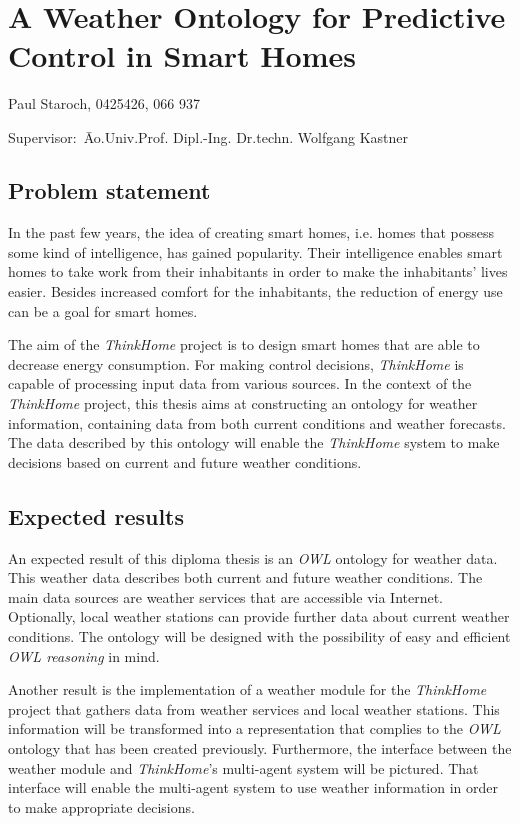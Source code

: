 \documentclass{scrartcl}
\begin{document}
~\vspace{0.5cm}
\section*{A Weather Ontology for Predictive Control in Smart Homes}
Paul Staroch, 0425426, 066 937
\begin{tabbing}
Supervisor:\ \= Ao.Univ.Prof. Dipl.-Ing. Dr.techn. Wolfgang Kastner\\
\end{tabbing}

\subsection*{Problem statement}
In the past few years, the idea of creating smart homes, i.e. homes that possess some kind of intelligence, has gained popularity.
Their intelligence enables smart homes to take work from their inhabitants in order to make the inhabitants' lives easier.
Besides increased comfort for the inhabitants, the reduction of energy use can be a goal for smart homes.

The aim of the \textit{ThinkHome} project \cite{CR2011-TH_Journal} \cite{CR2010-DEST_ThinkHome} is to design smart homes that are able to decrease energy consumption.
For making control decisions, \textit{ThinkHome} is capable of processing input data from various sources.
In the context of the \textit{ThinkHome} project, this thesis aims at constructing an ontology for weather information, containing data from both current conditions and weather forecasts.
The data described by this ontology will enable the \textit{ThinkHome} system to make decisions based on current and future weather conditions.

\subsection*{Expected results}
An expected result of this diploma thesis is an \textit{OWL} ontology for weather data. This weather data describes both current and future weather conditions.
The main data sources are weather services that are accessible via Internet. Optionally, local weather stations can provide further data about current weather conditions.
The ontology will be designed with the possibility of easy and efficient \textit{OWL reasoning} in mind.

Another result is the implementation of a weather module for the \textit{ThinkHome} project that gathers data from weather services and local weather stations.
This information will be transformed into a representation that complies to the \textit{OWL} ontology that has been created previously.
Furthermore, the interface between the weather module and \textit{ThinkHome}'s multi-agent system will be pictured.
That interface will enable the multi-agent system to use weather information in order to make appropriate decisions.
\end{document}
